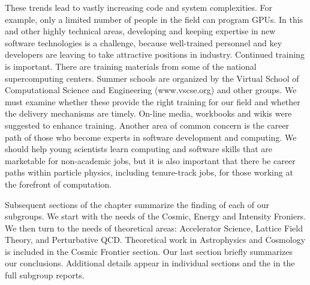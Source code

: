 These trends lead to vastly increasing code and system complexities. For
example, only a limited number of people in the field can program GPUs. In
this and other highly technical areas, developing and keeping expertise in
new software technologies is a challenge, because well-trained personnel and
key developers are leaving to take attractive positions in industry.
Continued training is important.  There are training materials
from some of the national supercomputing centers.  Summer schools are
organized by the Virtual School of Computational Science and
Engineering (www.vscse.org) and other groups. 
We must examine whether these provide the
right training for our field and whether the delivery mechanisms are
timely.  On-line media, workbooks and wikis were suggested to enhance
training. Another area of common concern is the career path of those who
become experts in software development and computing. We should help
young scientists learn computing and software skills that are marketable
for non-academic jobs, but it is also important that there be career paths
within particle physics, including tenure-track jobs, for those working at
the forefront of computation.

Subsequent sections of the chapter summarize the finding of each of our subgroups.
We start with the needs of the Cosmic, Energy and Intensity Froniers.  We then
turn to the needs of theoretical areas: Accelerator Science, Lattice Field Theory,
and Perturbative QCD.  Theoretical work in Astrophysics and Cosmology is included
in the Cosmic Frontier section.  Our last section briefly summarizes our conclusions.
Additional details appear in individual sections and the in the full subgroup
reports.

